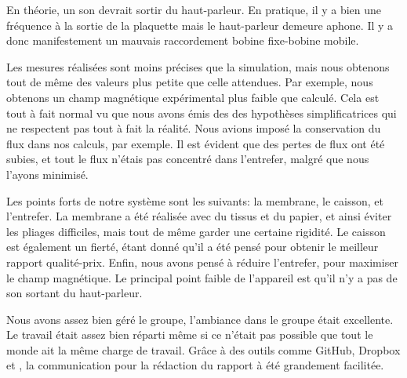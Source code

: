 

En théorie, un son devrait sortir du haut-parleur.  En pratique, il y a bien une fréquence
à la sortie de la plaquette mais le haut-parleur demeure aphone. Il y a donc manifestement 
un mauvais raccordement bobine fixe-bobine mobile.

Les mesures réalisées sont moins précises que la simulation, mais nous obtenons tout de même 
des valeurs plus petite que celle attendues.  Par exemple, nous obtenons un champ magnétique
expérimental plus faible que calculé.  Cela est tout à fait normal vu que nous avons émis des
des hypothèses simplificatrices qui ne respectent pas tout à fait la réalité. Nous avions 
imposé la conservation du flux dans nos calculs, par exemple. Il est évident que des pertes de flux 
ont été subies, et tout le flux n'étais pas concentré dans l'entrefer, malgré que nous l'ayons minimisé.

Les points forts de notre système sont les suivants: la membrane, le caisson, et l'entrefer. La membrane a 
été réalisée avec du tissus et du papier, et ainsi éviter les pliages difficiles, mais tout de même garder 
une certaine rigidité.  Le caisson est également un fierté, étant donné qu'il a été pensé pour obtenir le
meilleur rapport qualité-prix. Enfin, nous avons pensé à réduire l'entrefer, pour maximiser le champ magnétique.
Le principal point faible de l'appareil est qu'il n'y a pas de son sortant du haut-parleur.

Nous avons assez bien géré le groupe, l'ambiance dans le groupe était excellente.  Le travail était assez bien réparti
même si ce n'était pas possible que tout le monde ait la même charge de travail.  Grâce à des outils comme GitHub, Dropbox et 
\Latex, la communication pour la rédaction du rapport à été grandement facilitée.

